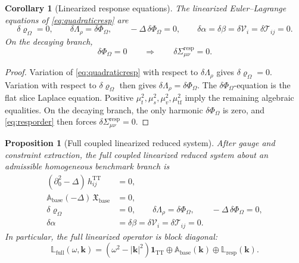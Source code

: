 \documentclass[11pt]{article}
\newcommand{\ResponseShift}{\Sigma^{\mathrm{resp}}}
\newcommand{\FlowPot}{\Phi_\Omega}
\newcommand{\SourceDensity}{\varrho_\Omega}
\newcommand{\SourceMult}{\Lambda_\rho}
\newcommand{\BaseAux}{\mathfrak X_{\mathrm{base}}}
\newcommand{\BaseEll}{\mathbb A_{\mathrm{base}}}
\newcommand{\FullLin}{\mathbb L_{\mathrm{full}}}
\newcommand{\RespLin}{\mathbb L_{\mathrm{resp}}}
\newcommand{\TT}{\mathrm{TT}}
\newtheorem{proposition}{Proposition}
\newtheorem{corollary}{Corollary}
\begin{document}
\begin{corollary}[Linearized response equations]
\label{cor:respeqs}
The linearized Euler--Lagrange equations of \eqref{eq:quadraticresp} are
\begin{equation}
\delta\SourceDensity=0,
\qquad
\delta\SourceMult=\delta\FlowPot,
\qquad
-\Delta\,\delta\FlowPot=0,
\qquad
\delta\alpha=\delta\beta=\delta\mathcal V_i=\delta\mathcal T_{ij}=0.
\label{eq:linearresp}
\end{equation}
On the decaying branch,
\begin{equation}
\delta\FlowPot=0
\qquad\Longrightarrow\qquad
\delta\ResponseShift_{\mu\nu}=0.
\label{eq:deltasigma}
\end{equation}
\end{corollary}

\begin{proof}
Variation of \eqref{eq:quadraticresp} with respect to \(\delta\SourceMult\) gives \(\delta\SourceDensity=0\). Variation with respect to \(\delta\SourceDensity\) then gives \(\delta\SourceMult=\delta\FlowPot\). The \(\delta\FlowPot\)-equation is the flat slice Laplace equation. Positive \(\mu_t^2,\mu_s^2,\mu_v^2,\mu_{\mathrm{tf}}^2\) imply the remaining algebraic equalities. On the decaying branch, the only harmonic \(\delta\FlowPot\) is zero, and \eqref{eq:resporder} then forces \(\delta\ResponseShift_{\mu\nu}=0\).
\end{proof}

\begin{proposition}[Full coupled linearized reduced system]
\label{prop:fullsystem}
After gauge and constraint extraction, the full coupled linearized reduced system about an admissible homogeneous benchmark branch is
\begin{align}
(\partial_0^2-\Delta)\,h^{\TT}_{ij} &= 0,
\label{eq:ttwave}
\\
\BaseEll(-\Delta)\,\BaseAux &= 0,
\label{eq:baseaux}
\\
\delta\SourceDensity &=0,
\qquad
\delta\SourceMult=\delta\FlowPot,
\qquad
-\Delta\,\delta\FlowPot=0,
\label{eq:phiblock}
\\
\delta\alpha&=\delta\beta=\delta\mathcal V_i=\delta\mathcal T_{ij}=0.
\label{eq:auxblock}
\end{align}
In particular, the full linearized operator is block diagonal:
\begin{equation}
\FullLin(\omega,\mathbf{k})
=
(\omega^2-|\mathbf{k}|^2)\mathbf 1_{\TT}
\oplus
\BaseEll(\mathbf{k})
\oplus
\RespLin(\mathbf{k}).
\label{eq:blockdiag}
\end{equation}
\end{proposition}
\end{document}
